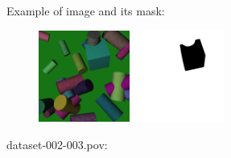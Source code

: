 Example of image and its mask:
\begin{center}
\begin{figure}[H]
\centering\includegraphics[width=3cm]{./img-002-003.png}
\centering\includegraphics[width=3cm]{./mask-002-003.png}
\end{figure}
\end{center}

dataset-002-003.pov:
\begin{scriptsize}
\begin{ttfamily}

\end{ttfamily}
\end{scriptsize}

